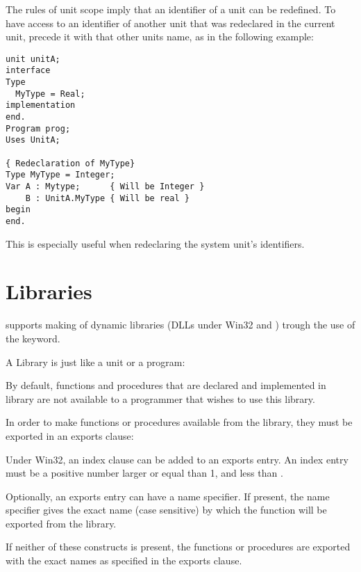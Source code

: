 The rules of unit scope imply that an identifier of a unit can be redefined. 
To have access to an identifier of another unit that was redeclared in
the current unit, precede it with that other units name, as in the following
example:
\begin{verbatim}
unit unitA;
interface
Type
  MyType = Real;
implementation
end.
Program prog;
Uses UnitA;

{ Redeclaration of MyType}
Type MyType = Integer;
Var A : Mytype;      { Will be Integer }
    B : UnitA.MyType { Will be real }
begin
end.
\end{verbatim}
This is especially useful when redeclaring the system unit's identifiers.

\section{Libraries}
 

\fpc supports making of dynamic libraries (DLLs under Win32 and \ostwo) trough
the use of the  keyword.

A Library is just like a unit or a program:


By default, functions and procedures that are declared and implemented in
library are not available to a programmer that wishes to use this library.

In order to make functions or procedures available from the library,
they must be exported in an exports clause:



Under Win32, an index clause can be added to an exports entry.
An index entry must be a positive number larger or equal than 1, and less
than .

Optionally, an exports entry can have a name specifier. If present, the name
specifier gives the exact name (case sensitive) by which the function will
be exported from the library.

If neither of these constructs is present, the functions or procedures
are exported with the exact names as specified in the exports clause.

